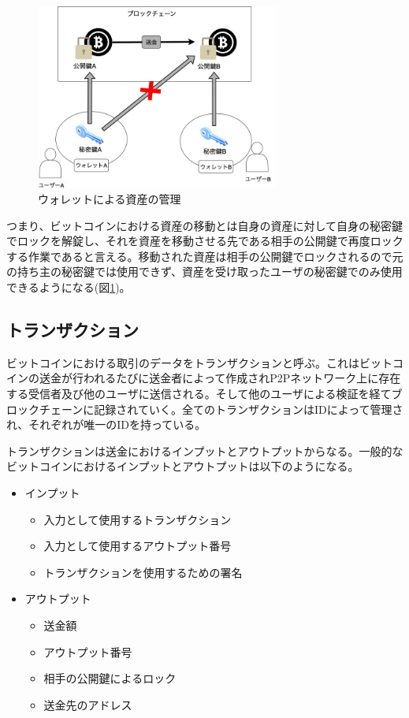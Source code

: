 \documentclass[12pt]{jarticle}
\begin{document}
\begin{figure}[h]
 \centering
   \includegraphics[width=80mm]{figures/wallet.jpg}
 \caption{ウォレットによる資産の管理}
 \label{wallet}
\end{figure}

つまり、ビットコインにおける資産の移動とは自身の資産に対して自身の秘密鍵でロックを解錠し、それを資産を移動させる先である相手の公開鍵で再度ロックする作業であると言える。移動された資産は相手の公開鍵でロックされるので元の持ち主の秘密鍵では使用できず、資産を受け取ったユーザの秘密鍵でのみ使用できるようになる(図\ref{wallet})。

\subsection{トランザクション}
ビットコインにおける取引のデータをトランザクションと呼ぶ。これはビットコインの送金が行われるたびに送金者によって作成されP2Pネットワーク上に存在する受信者及び他のユーザに送信される。そして他のユーザによる検証を経てブロックチェーンに記録されていく。全てのトランザクションはIDによって管理され、それぞれが唯一のIDを持っている。\par
トランザクションは送金におけるインプットとアウトプットからなる。一般的なビットコインにおけるインプットとアウトプットは以下のようになる。
\begin{itemize}
\item インプット
\begin{itemize}
\item 入力として使用するトランザクション
\item 入力として使用するアウトプット番号
\item トランザクションを使用するための署名
\end{itemize}

\item アウトプット 
\begin{itemize}
\item 送金額
\item アウトプット番号
\item 相手の公開鍵によるロック
\item 送金先のアドレス
\end{itemize}
\end{itemize}
\end{document}
